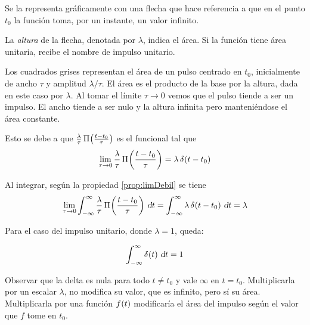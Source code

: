 Se la representa gráficamente con una flecha que hace referencia a que en el punto $t_0$ la función toma, por un instante, un valor infinito.

\begin{center}
    \def\svgwidth{0.6\linewidth}
    
\end{center}

La \emph{altura} de la flecha, denotada por $\lambda$, indica el área.
Si la función tiene área unitaria, recibe el nombre de impulso unitario.

Los cuadrados grises representan el área de un pulso centrado en $t_0$, inicialmente de ancho $\tau$ y amplitud $\lambda / \tau$.
El área es el producto de la base por la altura, dada en este caso por $\lambda$.
Al tomar el límite $\tau \to 0$ vemos que el pulso tiende a ser un impulso.
El ancho tiende a ser nulo y la altura infinita pero manteniéndose el área constante.

Esto se debe a que $\frac{\lambda}{\tau} \, \pulse[t_0]{t}{\tau}$ es el funcional tal que
\begin{equation*}
    \lim_{\tau \to 0} \frac{\lambda}{\tau} \, \pulse[t_0]{t}{\tau} = \lambda \, \fx[\delta]{t-t_0}
\end{equation*}

Al integrar, según la propiedad \ref{prop:limDebil} se tiene
\begin{equation*}
    \lim_{\tau \to 0} \int_{-\infty}^\infty \frac{\lambda}{\tau} \, \pulse[t_0]{t}{\tau} \, \dif t
    = \int_{-\infty}^\infty \lambda \, \fx[\delta]{t-t_0} \, \dif t
    = \lambda
\end{equation*}

Para el caso del impulso unitario, donde $\lambda = 1$, queda:

\begin{mdframed}[style=PropertyFrame]
    \begin{prop}
    \end{prop}
    \begin{equation*}
        \int_{-\infty}^\infty \fx[\delta]{t} \, \dif t = 1
    \end{equation*}
\end{mdframed}

Observar que la delta es nula para todo $t \neq t_0$ y vale $\infty$ en $t = t_0$.
Multiplicarla por un escalar $\lambda$, no modifica su valor, que es infinito, pero sí su área.
Multiplicarla por una función $\fx{t}$ modificaría el área del impulso según el valor que $f$ tome en $t_0$.

